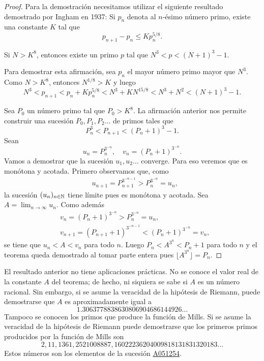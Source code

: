 \begin{proof}
	Para la demostración necesitamos utilizar el siguiente resultado demostrado
	por Ingham en 1937: Si $p_n$ denota al $n$-ésimo número primo, existe una
	constante $K$ tal que 
	\[
		p_{n+1}-p_n\leq Kp_n^{5/8}.
	\]

	\begin{claim}
		Si $N>K^8$, entonces existe un primo $p$ tal que $N^3<p<(N+1)^3-1$. 
	\end{claim}

	Para demostrar esta afirmación, sea $p_n$ el mayor número primo mayor que
	$N^3$. Como $N>K^8$, entonces $N^{1/8}>K$ y luego
	\[
		N^3<p_{n+1}<p_n+Kp_n^{5/8}<N^3+KN^{15/8}<N^3+N^2<(N+1)^3-1.
	\]

	Sea $P_0$ un número primo tal que $P_0>K^8$. La afirmación anterior nos
	permite construir una sucesión $P_0,P_1,P_2\dots$ de primos tales que
	\[
		P_n^3<P_{n+1}<(P_n+1)^3-1.
	\]
	Sean 
	\[
		u_n=P_n^{3^{-n}},\quad
		v_n=(P_n+1)^{3^{-n}}.
	\]
	Vamos a demostrar que la sucesión $u_1,u_2\dots$ converge. Para eso veremos que es monótona y acotada. 
	Primero observamos que, como 
	\begin{align*}
		&u_{n+1}=P_{n+1}^{3^{-n-1}}>P_n^{3^{-n}}=u_n,
	\end{align*}
	la sucesión $(u_n)_{n\in\mathbb{N}}$ tiene límite pues es monótona y acotada. 
	Sea $A=\lim_{n\to\infty}u_n$. Como además 
	\begin{align*}
		&v_n=(P_n+1)^{3^{-n}}>P_n^{3^{-n}}=u_n,\\
		&v_{n+1}=(P_{n+1}+1)^{3^{-n-1}}<(P_n+1)^{3^{-n}}=v_n,
	\end{align*}
	se tiene que
	$u_n<A<v_n$ para todo $n$. Luego $P_n<A^{3^n}<P_n+1$ para todo $n$ y el
	teorema queda demostrado al tomar parte entera pues $\lfloor
	A^{3^n}\rfloor=P_n$. 
\end{proof}

El resultado anterior no tiene aplicaciones prácticas. No se conoce el valor
real de la constante $A$ del teorema; de hecho, ni siquiera se sabe si $A$ es
un número racional. Sin embargo, si se asume la veracidad de la hipótesis de
Riemann, puede demostrarse que $A$ es aproximadamente igual a
\[
	1.3063778838630806904686144926\dots
\]
Tampoco se conocen los primos que produce la función de Mills. Si se asume la
veracidad de la hipótesis de Riemann puede demostrarse que los primeros primos
producidos por la función de Mills son
\[
    2,11,1361,2521008887, 16022236204009818131831320183\dots
\]
Estos números son los elementos de la sucesión
\href{https://oeis.org/A051254}{A051254}.

